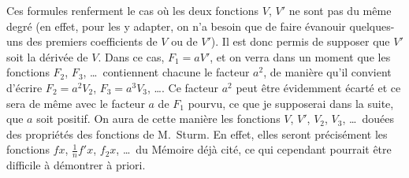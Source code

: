 \documentclass[11pt]{article}
\begin{document}
Ces formules renferment le cas o\`u les deux fonctions $V$, $V'$ ne sont pas du m\^eme
degr\'e (en effet, pour les y adapter, on n'a besoin que de faire \'evanouir quelques-uns
des premiers coefficients de $V$ ou de $V'$). Il est donc permis de supposer que $V'$ soit
la d\'eriv\'ee de $V$. Dans ce cas, $F_{1} = aV'$, et on verra dans un moment que les fonctions
$F_{2}$, $F_{3}$, \ldots\ contiennent chacune le facteur $a^{2}$, de mani\`ere qu'il convient d'\'ecrire $F_{2} = a^{2}V_{2}$,
$F_{3} = a^{3}V_{3}$, \ldots. Ce facteur $a^{2}$ peut \^etre \'evidemment \'ecart\'e et ce sera de m\^eme avec le
facteur $a$ de $F_{1}$ pourvu, ce que je supposerai dans la suite, que $a$ soit positif. On aura
de cette mani\`ere les fonctions $V$, $V'$, $V_{2}$, $V_{3}$, \ldots\ dou\'ees des propri\'et\'es des fonctions de
M.~Sturm. En effet, elles seront pr\'ecis\'ement les fonctions $fx$, $\tfrac{1}{n}f'x$, $f_{2}x$, \ldots\ du M\'emoire
d\'ej\`a cit\'e, ce qui cependant pourrait \^etre difficile \`a d\'emontrer \`a priori.
\end{document}
